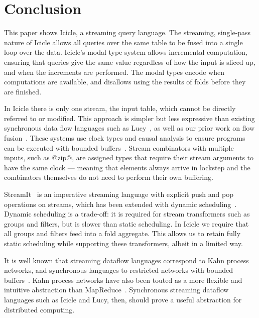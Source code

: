 \eject
\section{Conclusion}
\label{s:Conclusion}
This paper shows Icicle, a streaming query language.
The streaming, single-pass nature of Icicle allows all queries over the same table to be fused into a single loop over the data.
Icicle's modal type system allows incremental computation, ensuring that queries give the same value regardless of how the input is sliced up, and when the increments are performed.
The modal types encode when computations are available, and disallows using the results of folds before they are finished.

In Icicle there is only one stream, the input table, which cannot be directly referred to or modified.
This approach is simpler but less expressive than existing synchronous data flow languages such as Lucy~\cite{mandel2010lucy}, as well as our prior work on flow fusion~\cite{lippmeier2013data}.
These systems use clock types and causal analysis to ensure programs can be executed with bounded buffers~\cite{stephens1997survey}.
Stream combinators with multiple inputs, such as @zip@, are assigned types that require their stream arguments to have the same clock --- meaning that elements always arrive in lockstep and the combinators themselves do not need to perform their own buffering.

StreamIt~\cite{thies2002streamit} is an imperative streaming language with explicit push and pop operations on streams, which has been extended with dynamic scheduling~\cite{soule2013dynamic}. 
Dynamic scheduling is a trade-off: it is required for stream transformers such as groups and filters, but is slower than static scheduling.
In Icicle we require that all groups and filters feed into a fold aggregate.
This allows us to retain fully static scheduling while supporting these transformers, albeit in a limited way.

It is well known that streaming dataflow languages correspond to Kahn process networks, and synchronous languages to restricted networks with bounded buffers~\cite{johnston2004advances}.
Kahn process networks have also been touted as a more flexible and intuitive abstraction than MapReduce~\cite{vrba2009kahn}.
Synchronous streaming dataflow languages such as Icicle and Lucy, then, should prove a useful abstraction for distributed computing.


